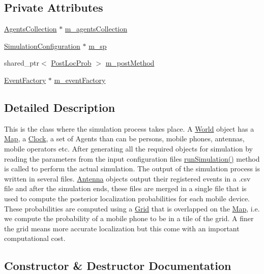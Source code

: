 \subsection*{Private Attributes}
\begin{DoxyCompactItemize}
\item 
\hyperlink{class_agents_collection}{Agents\+Collection} $\ast$ \hyperlink{class_world_ae1262689381f00828c0a639b7cbb52a3}{m\+\_\+agents\+Collection}
\item 
\hyperlink{class_simulation_configuration}{Simulation\+Configuration} $\ast$ \hyperlink{class_world_ac1da5b3ecad51c54f1ff0c8e8c0fb611}{m\+\_\+sp}
\item 
shared\+\_\+ptr$<$ \hyperlink{class_post_loc_prob}{Post\+Loc\+Prob} $>$ \hyperlink{class_world_a434bcb4c18cc7b3194d1ea6c09b76284}{m\+\_\+post\+Method}
\item 
\hyperlink{class_event_factory}{Event\+Factory} $\ast$ \hyperlink{class_world_a0fc6b10e0bceb90958d2bdfd04f247c7}{m\+\_\+event\+Factory}
\end{DoxyCompactItemize}


\subsection{Detailed Description}
This is the class where the simulation process takes place. A \hyperlink{class_world}{World} object has a \hyperlink{class_map}{Map}, a \hyperlink{class_clock}{Clock}, a set of Agents than can be persons, mobile phones, antennas, mobile operators etc. After generating all the required objects for simulation by reading the parameters from the input configuration files \hyperlink{class_world_aa825a43f968c8fe750c67156e64721ff}{run\+Simulation()} method is called to perform the actual simulation. The output of the simulation process is written in several files. \hyperlink{class_antenna}{Antenna} objects output their registered events in a .csv file and after the simulation ends, these files are merged in a single file that is used to compute the posterior localization probabilities for each mobile device. These probabilities are computed using a \hyperlink{class_grid}{Grid} that is overlapped on the \hyperlink{class_map}{Map}, i.\+e. we compute the probability of a mobile phone to be in a tile of the grid. A finer the grid means more accurate localization but this come with an important computational cost. 

\subsection{Constructor \& Destructor Documentation}
\mbox{\label{class_world_adeb8454b3713d9dc1d05ca1f901e7b77}} 
